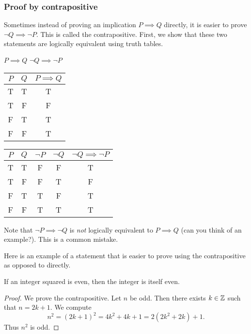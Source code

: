 \documentclass{article}
\begin{document}
\subsubsection{Proof by contrapositive}
Sometimes instead of proving an implication $P \implies Q$ directly, it is easier to prove $\neg Q \implies \neg P$. This is called the contrapositive. First, we show that these two statements are logically equivalent using truth tables. 

$P \implies Q$  \hspace{5cm}  $\neg Q \implies \neg P$

        \vspace{1em}
\begin{tabular}{|c|c| c|}
\hline
     $P$& $Q$ &  $P \implies Q$ \\ \hline
     T& T & T \\ \hline
     T & F & F \\ \hline
     F & T & T \\ \hline
     F & F & T \\ \hline
\end{tabular}   \hspace{2cm}  \begin{tabular}{|c | c | c |  c | c |}
\hline
     $P$& $Q$ & $\neg P$ &  $\neg Q$ & $\neg Q \implies \neg P$ \\ \hline
     T& T & F & F & T \\ \hline
     T & F & F &  T & F \\ \hline
     F & T &  T  & F & T \\ \hline
     F & F & T & T & T \\ \hline
\end{tabular}
\vspace{1.5em}

Note that $\neg P \implies \neg Q$ is \emph{not} logically equivalent to  $P \implies Q$ (can you think of an example?). This is a common mistake.

Here is an example of a statement that is easier to prove using the contrapositive as opposed to directly.

\begin{example}
If an integer squared is even, then the integer is itself even.
\end{example}

\begin{proof}
We prove the contrapositive. Let $n$ be odd. Then there exists $k \in {\mathbb{Z}}$ such that $n = 2k + 1$. We compute
$$n^2 = (2k + 1)^2 = 4k^2 + 4k + 1 = 2(2k^2+2k) + 1.$$
Thus $n^2$ is odd.
\end{proof}
\end{document}
